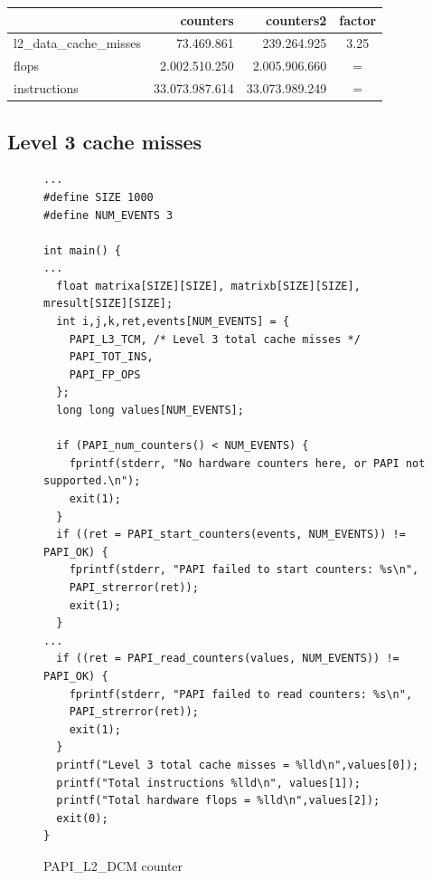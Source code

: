 \documentclass[12pt]{article}
\begin{document}
\begin{tabular}{|l|r|r|c|}
	\hline
	 & counters & counters2 & factor \\
	\hline
	l2\_data\_cache\_misses & 73.469.861 & 239.264.925 & 3.25 \\
	flops & 2.002.510.250 & 2.005.906.660 & = \\
	instructions & 33.073.987.614 & 33.073.989.249 & = \\
	\hline
\end{tabular}

\newpage

\subsection*{Level 3 cache misses}

\begin{figure}[h!]
	\begin{verbatim}
...
#define SIZE 1000
#define NUM_EVENTS 3

int main() {
...
  float matrixa[SIZE][SIZE], matrixb[SIZE][SIZE], mresult[SIZE][SIZE];
  int i,j,k,ret,events[NUM_EVENTS] = {
    PAPI_L3_TCM, /* Level 3 total cache misses */
    PAPI_TOT_INS,
    PAPI_FP_OPS
  };
  long long values[NUM_EVENTS];

  if (PAPI_num_counters() < NUM_EVENTS) {
    fprintf(stderr, "No hardware counters here, or PAPI not supported.\n");
    exit(1);
  }
  if ((ret = PAPI_start_counters(events, NUM_EVENTS)) != PAPI_OK) {
    fprintf(stderr, "PAPI failed to start counters: %s\n",
    PAPI_strerror(ret));
    exit(1);
  }
...
  if ((ret = PAPI_read_counters(values, NUM_EVENTS)) != PAPI_OK) {
    fprintf(stderr, "PAPI failed to read counters: %s\n",
    PAPI_strerror(ret));
    exit(1);
  }
  printf("Level 3 total cache misses = %lld\n",values[0]);
  printf("Total instructions %lld\n", values[1]);
  printf("Total hardware flops = %lld\n",values[2]);
  exit(0);
}
	\end{verbatim}
	\caption{PAPI\_L2\_DCM counter}\label{code:l3tcm}
\end{figure}

\newpage
\end{document}
